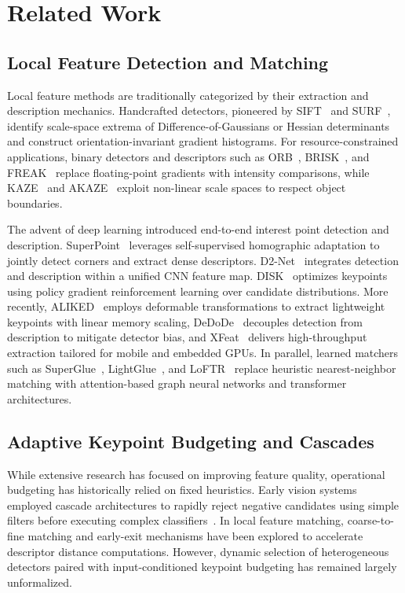 \documentclass[conference]{IEEEtran}
\begin{document}
\section{Related Work}
\label{sec:related}

\subsection{Local Feature Detection and Matching}
Local feature methods are traditionally categorized by their extraction and description mechanics. Handcrafted detectors, pioneered by SIFT~\cite{lowe2004sift} and SURF~\cite{bay2006surf}, identify scale-space extrema of Difference-of-Gaussians or Hessian determinants and construct orientation-invariant gradient histograms. For resource-constrained applications, binary detectors and descriptors such as ORB~\cite{rublee2011orb}, BRISK~\cite{leutenegger2011brisk}, and FREAK~\cite{alahi2012freak} replace floating-point gradients with intensity comparisons, while KAZE~\cite{alcantarilla2012kaze} and AKAZE~\cite{alcantarilla2013akaze} exploit non-linear scale spaces to respect object boundaries.

The advent of deep learning introduced end-to-end interest point detection and description. SuperPoint~\cite{detone2018superpoint} leverages self-supervised homographic adaptation to jointly detect corners and extract dense descriptors. D2-Net~\cite{dusmanu2019d2net} integrates detection and description within a unified CNN feature map. DISK~\cite{tyszkiewicz2020disk} optimizes keypoints using policy gradient reinforcement learning over candidate distributions. More recently, ALIKED~\cite{zhao2023aliked} employs deformable transformations to extract lightweight keypoints with linear memory scaling, DeDoDe~\cite{edstedt2024dedode} decouples detection from description to mitigate detector bias, and XFeat~\cite{potje2024xfeat} delivers high-throughput extraction tailored for mobile and embedded GPUs. In parallel, learned matchers such as SuperGlue~\cite{sarlin2020superglue}, LightGlue~\cite{lindenberger2023lightglue}, and LoFTR~\cite{sun2021loftr} replace heuristic nearest-neighbor matching with attention-based graph neural networks and transformer architectures.

\subsection{Adaptive Keypoint Budgeting and Cascades}
While extensive research has focused on improving feature quality, operational budgeting has historically relied on fixed heuristics. Early vision systems employed cascade architectures to rapidly reject negative candidates using simple filters before executing complex classifiers~\cite{viola2001rapid}. In local feature matching, coarse-to-fine matching and early-exit mechanisms have been explored to accelerate descriptor distance computations. However, dynamic selection of heterogeneous detectors paired with input-conditioned keypoint budgeting has remained largely unformalized.
\end{document}
